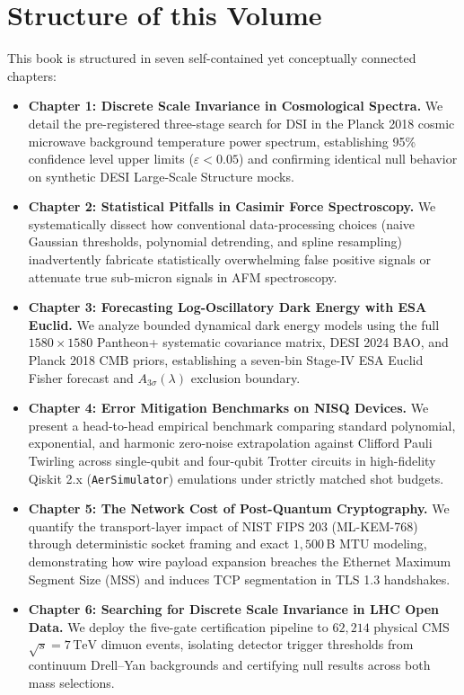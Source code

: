 \section*{Structure of this Volume}
This book is structured in seven self-contained yet conceptually connected chapters:
\begin{itemize}
    \item \textbf{Chapter 1: Discrete Scale Invariance in Cosmological Spectra.} We detail the pre-registered three-stage search for DSI in the Planck 2018 cosmic microwave background temperature power spectrum, establishing 95\% confidence level upper limits ($\varepsilon < 0.05$) and confirming identical null behavior on synthetic DESI Large-Scale Structure mocks.
    \item \textbf{Chapter 2: Statistical Pitfalls in Casimir Force Spectroscopy.} We systematically dissect how conventional data-processing choices (naive Gaussian thresholds, polynomial detrending, and spline resampling) inadvertently fabricate statistically overwhelming false positive signals or attenuate true sub-micron signals in AFM spectroscopy.
    \item \textbf{Chapter 3: Forecasting Log-Oscillatory Dark Energy with ESA Euclid.} We analyze bounded dynamical dark energy models using the full $1580 \times 1580$ Pantheon+ systematic covariance matrix, DESI 2024 BAO, and Planck 2018 CMB priors, establishing a seven-bin Stage-IV ESA Euclid Fisher forecast and $A_{3\sigma}(\lambda)$ exclusion boundary.
    \item \textbf{Chapter 4: Error Mitigation Benchmarks on NISQ Devices.} We present a head-to-head empirical benchmark comparing standard polynomial, exponential, and harmonic zero-noise extrapolation against Clifford Pauli Twirling across single-qubit and four-qubit Trotter circuits in high-fidelity Qiskit 2.x (\texttt{AerSimulator}) emulations under strictly matched shot budgets.
    \item \textbf{Chapter 5: The Network Cost of Post-Quantum Cryptography.} We quantify the transport-layer impact of NIST FIPS 203 (ML-KEM-768) through deterministic socket framing and exact $1{,}500\,$B MTU modeling, demonstrating how wire payload expansion breaches the Ethernet Maximum Segment Size (MSS) and induces TCP segmentation in TLS 1.3 handshakes.
    \item \textbf{Chapter 6: Searching for Discrete Scale Invariance in LHC Open Data.} We deploy the five-gate certification pipeline to $62,214$ physical CMS $\sqrt{s} = 7\,\mathrm{TeV}$ dimuon events, isolating detector trigger thresholds from continuum Drell--Yan backgrounds and certifying null results across both mass selections.

\end{itemize}
